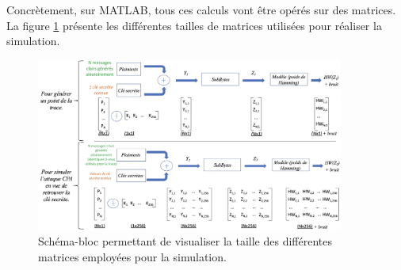 \documentclass[oneside]{book}
\begin{document}
Concrètement, sur MATLAB, tous ces calculs vont être opérés sur des matrices. La figure \ref{fig:simulCPA1} présente les différentes tailles de matrices utilisées pour réaliser la simulation.
\begin{figure}[htbp]
    \centering
    \includegraphics[width=0.9\textwidth]{image/simulCPA1}
    \caption{Schéma-bloc permettant de visualiser la taille des différentes matrices employées pour la simulation.}
    \label{fig:simulCPA1} 
\end{figure}
\end{document}
